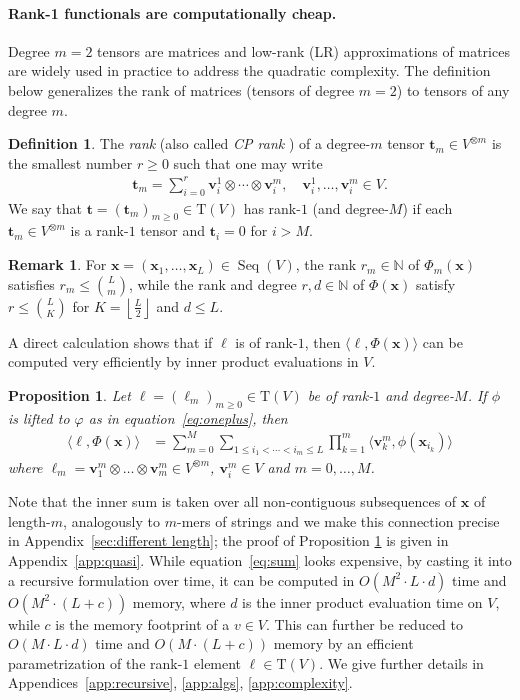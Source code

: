 \documentclass{article} \usepackage{iclr2021_conference,times}
\def\eqref#1{equation~\ref{#1}}
\newcommand{\bx}{\mathbf{x}}
\newcommand{\bv}{\mathbf{v}}
\newcommand{\NN}{\mathbb{N}}
\newcommand{\T}[1]{\mathrm{T}({#1})}
\newcommand{\bt}{\mathbf{t}}
\newcommand{\Seq}[1]{\operatorname{Seq}(#1)}
\theoremstyle{plain}
\newtheorem{proposition}[thm]{Proposition}
\theoremstyle{definition}
\newtheorem{definition}[thm]{Definition}
\newtheorem{remark}[thm]{Remark}
\begin{document}
\paragraph{Rank-1 functionals are computationally cheap.} 
Degree $m=2$ tensors are matrices and low-rank (LR) approximations of matrices are widely used in practice \citep{Udell19} to address the quadratic complexity. 
The definition below generalizes the rank of matrices (tensors of degree $m=2$) to tensors of any degree $m$. 
\begin{definition} \label{def:rank}
	The \emph{rank} (also called \emph{CP rank} \citep{carroll1970analysis}) of a degree-$m$ tensor $ \bt_m \in V^{\otimes m} $ is the smallest number $ r \geq 0 $ such that one may write
	\begin{align}
	\bt_m = \sum_{i=0}^r \bv_i^1 \otimes \cdots \otimes \bv_i^m, \quad \bv_i^1, \ldots, \bv_i^m \in V.
	\end{align}
  We say that $\bt = (\bt_m)_{m \ge0} \in \T{V}$ has rank-$1$ (and degree-$M$) if each $\bt_m \in V^{\otimes m}$ is a rank-$1$ tensor and $\bt_i=0$ for $i>M$.
\end{definition}
\begin{remark}
	For $\bx = (\bx_1, \dots, \bx_L) \in \Seq{V}$, the rank $r_m \in \NN$ of $\Phi_m(\bx)$ satisfies $r_m \leq {L \choose m}$, while the rank and degree $r, d \in \NN$ of $\Phi(\bx)$ satisfy $r \leq {L \choose K}$ for $K = \left\lfloor \frac{L}{2} \right\rfloor$ and $d \leq L$.
\end{remark}
A direct calculation shows that if $\ell$ is of rank-$1$, then $\langle \ell, \Phi(\bx) \rangle$ can be computed very efficiently by inner product evaluations in $V$.
\begin{proposition}\label{prop:rank one}
  Let $\ell=(\ell_m)_{m \ge 0} \in \T{V}$ be of rank-$1$ and degree-$M$.
  If $\phi $ is lifted to $\varphi$ as in \eqref{eq:oneplus}, then
  \begin{align}
    \langle \ell, \Phi(\bx)\rangle &=
\sum_{m=0}^M \sum_{1 \le i_1 < \cdots < i_m \leq L} \prod_{k=1}^m \langle \bv_k^m, \phi(\bx_{i_k})\rangle \label{eq:sum}
  \end{align}
where $\ell_m=\bv_1^m \otimes \dots \otimes \bv_m^m \in V^{\otimes m}$, $\bv_i^m \in V$ and $m=0,\ldots,M$.
\end{proposition}
Note that the inner sum is taken over all non-contiguous subsequences of $\bx$ of length-$m$, analogously to $m$-mers of strings and we make this connection precise in Appendix~\ref{sec:different length}; the proof of Proposition \ref{prop:rank one} is given in Appendix~\ref{app:quasi}. While \eqref{eq:sum} looks expensive, by casting it into a recursive formulation over time, it can be computed in $O(M^2 \cdot L \cdot d)$ time and $O(M^2 \cdot (L + c))$ memory, where $d$ is the inner product evaluation time on $V$, while $c$ is the memory footprint of a $v \in V$. This can further be reduced to $O(M \cdot L \cdot d)$ time and $O(M \cdot (L + c))$ memory by an efficient parametrization of the rank-$1$ element $\ell \in \T{V}$. We give further details in Appendices~\ref{app:recursive}, \ref{app:algs}, \ref{app:complexity}.
\end{document}
